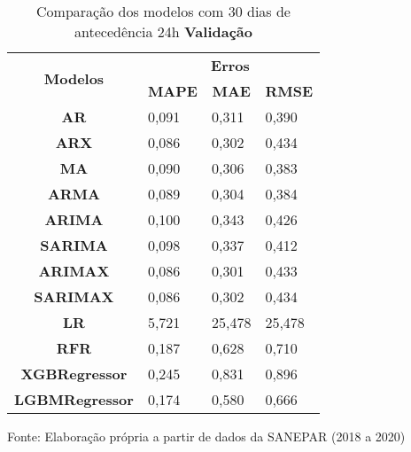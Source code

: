 \begin{table}[H]
	\centering
	\caption{Comparação dos modelos com 30 dias de antecedência 24h \textbf{Validação} }\label{tb:60-24vld}
	\begin{tabular}{@{}clll@{}}
		\toprule
		\multirow{2}{*}{\textbf{Modelos}} & \multicolumn{3}{c}{\textbf{Erros}}                                                                       \\ \cmidrule(l){2-4} 
		& \multicolumn{1}{c}{\textbf{MAPE}} & \multicolumn{1}{c}{\textbf{MAE}} & \multicolumn{1}{c}{\textbf{RMSE}} \\ \hline
\textbf{AR}                       & 0,091                             & 0,311                            & 0,390                             \\
\textbf{ARX}                      & 0,086                             & 0,302                            & 0,434                             \\
\textbf{MA}                       & 0,090                             & 0,306                            & 0,383                             \\
\textbf{ARMA}                     & 0,089                             & 0,304                            & 0,384                             \\
\textbf{ARIMA}                    & 0,100                             & 0,343                            & 0,426                             \\
\textbf{SARIMA}                   & 0,098                             & 0,337                            & 0,412                             \\
\textbf{ARIMAX}                   & 0,086                             & 0,301                            & 0,433                             \\
\textbf{SARIMAX}                  & 0,086                             & 0,302                            & 0,434                             \\
\textbf{LR}                       & 5,721                             & 25,478                           & 25,478                            \\
\textbf{RFR}                      & 0,187                             & 0,628                            & 0,710                             \\
\textbf{XGBRegressor}             & 0,245                             & 0,831                            & 0,896                             \\
\textbf{LGBMRegressor}            & 0,174                             & 0,580                            & 0,666                             \\ \bottomrule
	\end{tabular}

Fonte: Elaboração própria a partir de dados da SANEPAR (2018 a 2020)
\end{table}

